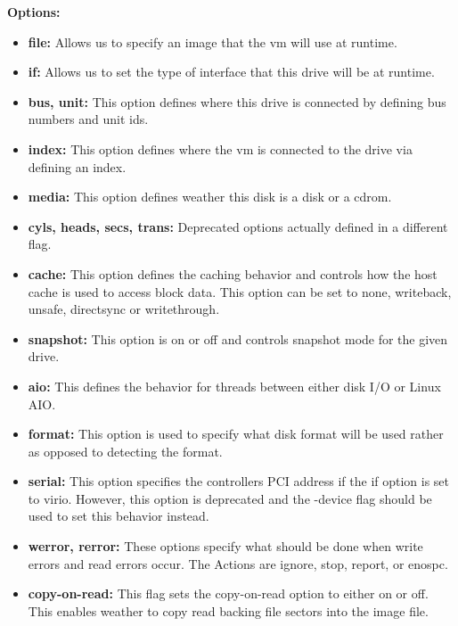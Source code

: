 \documentclass[draftclsnofoot, onecolumn, compsoc, 10pt]{IEEEtran}
\begin{document}
		\textbf{Options:}
		\begin{itemize}
			\item \textbf{file:} Allows us to specify an image that the vm will use at runtime.
			\item \textbf{if:} Allows us to set the type of interface that this drive will be at runtime.\\
			\item \textbf{bus, unit:} This option defines where this drive is connected by defining bus numbers and unit ids.\\
			\item \textbf{index:} This option defines where the vm is connected to the drive via defining an index.\\
			\item \textbf{media:} This option defines weather this disk is a disk or a cdrom.\\
			\item \textbf{cyls, heads, secs, trans:} Deprecated options actually defined in a different flag.\\
			\item \textbf{cache:} This option defines the caching behavior and controls how the host cache is used to access block data. This option can be set to none, writeback, unsafe, directsync or writethrough.
			\item \textbf{snapshot:} This option is on or off and controls snapshot mode for the given drive.\\
			\item \textbf{aio:} This defines the behavior for threads between either disk I/O or Linux AIO.\\
			\item \textbf{format:} This option is used to specify what disk format will be used rather as opposed to detecting the format.\\
			\item \textbf{serial:} This option specifies the controllers PCI address if the if option is set to virio. However, this option is deprecated and the -device flag should be used to set this behavior instead.\\
			\item \textbf{werror, rerror:} These options specify what should be done when write errors and read errors occur. The Actions are ignore, stop, report, or enospc.\\
			\item \textbf{copy-on-read:} This flag sets the copy-on-read option to either on or off. This enables weather to copy read backing file sectors into the image file.\\

\end{itemize}
\end{document}
